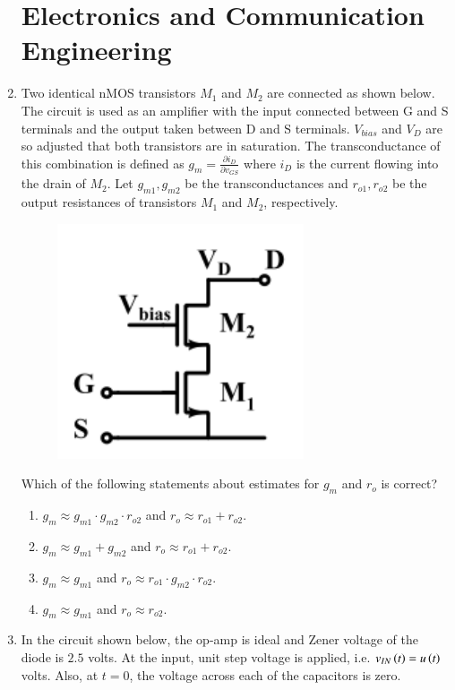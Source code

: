 \documentclass[a4paper, 11pt]{article}
\begin{document}
\begin{enumerate}
\section*{Electronics and Communication Engineering }
    \item Two identical nMOS transistors $M_1$ and $M_2$ are connected as shown below. The circuit is used as an amplifier with the input connected between G and S terminals and the output taken between D and S terminals. $V_{bias}$ and $V_D$ are so adjusted that both transistors are in saturation. The transconductance of this combination is defined as $g_m = \frac{\partial i_D}{\partial v_{GS}}$ where $i_D$ is the current flowing into the drain of $M_2$. Let $g_{m1}, g_{m2}$ be the transconductances and $r_{o1}, r_{o2}$ be the output resistances of transistors $M_1$ and $M_2$, respectively.
    
    \begin{figure}[H]
        \centering
        \includegraphics[width=0.4\columnwidth]{figs/q1.png}
        \caption*{}
        \label{fig:q1}
    \end{figure}
    Which of the following statements about estimates for $g_m$ and $r_o$ is correct?
    \begin{enumerate}
        \item $g_m \approx g_{m1} \cdot g_{m2} \cdot r_{o2}$ and $r_o \approx r_{o1} + r_{o2}$.
        \item $g_m \approx g_{m1} + g_{m2}$ and $r_o \approx r_{o1} + r_{o2}$.
        \item $g_m \approx g_{m1}$ and $r_o \approx r_{o1} \cdot g_{m2} \cdot r_{o2}$.
        \item $g_m \approx g_{m1}$ and $r_o \approx r_{o2}$.
    \end{enumerate}

    \hfill{}

    \item In the circuit shown below, the op-amp is ideal and Zener voltage of the diode is $2.5$ volts. At the input, unit step voltage is applied, i.e. $v_{IN}\left(t\right) = u\left(t\right)$ volts. Also, at $t=0$, the voltage across each of the capacitors is zero.


\end{enumerate}
\end{document}
